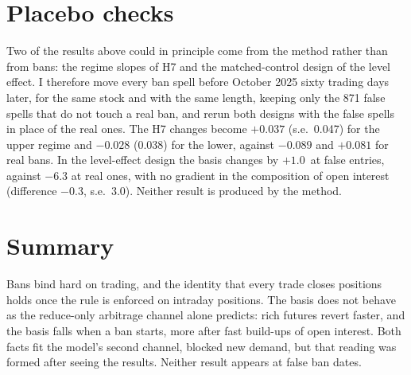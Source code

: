 \section{Placebo checks}
Two of the results above could in principle come from the method rather than from bans: the regime slopes of H7 and the
matched-control design of the level effect. I therefore move every ban spell before October 2025 sixty trading days later,
for the same stock and with the same length, keeping only the 871 false spells that do not touch a real ban, and rerun both
designs with the false spells in place of the real ones. The H7 changes become $+0.037$ (s.e.\ 0.047) for the upper regime
and $-0.028$ (0.038) for the lower, against $-0.089$ and $+0.081$ for real bans. In the level-effect design the basis
changes by $+1.0$\bp\ at false entries, against $-6.3$ at real ones, with no gradient in the composition of open interest
(difference $-0.3$\bp, s.e.\ 3.0). Neither result is produced by the method.

\section{Summary}
Bans bind hard on trading, and the identity that every trade closes positions holds once the rule is enforced on intraday
positions. The basis does not behave as the reduce-only arbitrage channel alone predicts: rich futures revert faster, and
the basis falls when a ban starts, more after fast build-ups of open interest. Both facts fit the model's second channel,
blocked new demand, but that reading was formed after seeing the results. Neither result appears at false ban dates.
